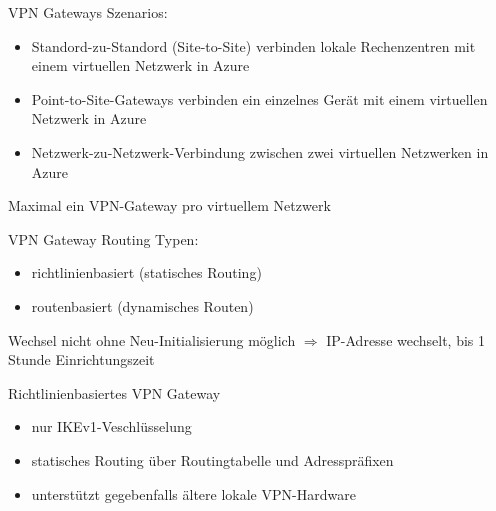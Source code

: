 

\begin{flashcard}[Definition]{VPN Gateways}
    Szenarios:
    \begin{itemize}
        \item Standord-zu-Standord (Site-to-Site) verbinden lokale Rechenzentren mit einem virtuellen Netzwerk in Azure
        \item Point-to-Site-Gateways verbinden ein einzelnes Gerät mit einem virtuellen Netzwerk in Azure
        \item Netzwerk-zu-Netzwerk-Verbindung zwischen zwei virtuellen Netzwerken in Azure
    \end{itemize}

    Maximal ein VPN-Gateway pro virtuellem Netzwerk

\end{flashcard}

\begin{flashcard}[Definition]{VPN Gateway Routing}
    Typen:
    \begin{itemize}
        \item richtlinienbasiert (statisches Routing)
        \item routenbasiert (dynamisches Routen)
    \end{itemize}

    \vspace{1cm}
    Wechsel nicht ohne Neu-Initialisierung möglich\newline
    $\Rightarrow$ IP-Adresse wechselt, bis 1 Stunde Einrichtungszeit

\end{flashcard}

\begin{flashcard}[Definition]{Richtlinienbasiertes VPN Gateway}
    \begin{itemize}
        \item nur IKEv1-Veschlüsselung
        \item statisches Routing über Routingtabelle und Adresspräfixen
        \item unterstützt gegebenfalls ältere lokale VPN-Hardware
    \end{itemize}
\end{flashcard}

